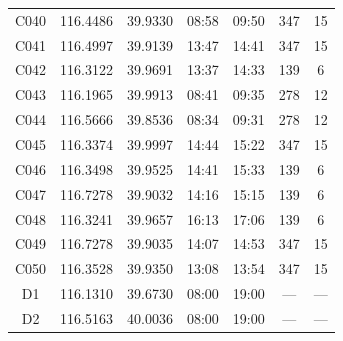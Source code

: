 \documentclass{setp-new}
\begin{document}
\begin{table}[H]
\begin{tabular*}{\textwidth}{@{\extracolsep{\fill}}ccccccc@{}}
C040 & 116.4486 & 39.9330 & 08:58 & 09:50 & 347 & 15\\
C041 & 116.4997 & 39.9139 & 13:47 & 14:41 & 347 & 15\\
C042 & 116.3122 & 39.9691 & 13:37 & 14:33 & 139 & 6\\
C043 & 116.1965 & 39.9913 & 08:41 & 09:35 & 278 & 12\\
C044 & 116.5666 & 39.8536 & 08:34 & 09:31 & 278 & 12\\
C045 & 116.3374 & 39.9997 & 14:44 & 15:22 & 347 & 15\\
C046 & 116.3498 & 39.9525 & 14:41 & 15:33 & 139 & 6\\
C047 & 116.7278 & 39.9032 & 14:16 & 15:15 & 139 & 6\\
C048 & 116.3241 & 39.9657 & 16:13 & 17:06 & 139 & 6\\
C049 & 116.7278 & 39.9035 & 14:07 & 14:53 & 347 & 15\\
C050 & 116.3528 & 39.9350 & 13:08 & 13:54 & 347 & 15\\
D1 & 116.1310 & 39.6730 & 08:00 & 19:00 & --- & ---\\
D2 & 116.5163 & 40.0036 & 08:00 & 19:00 & --- & ---\\
\bottomrule
\end{tabular*}
\end{table}
\end{document}
